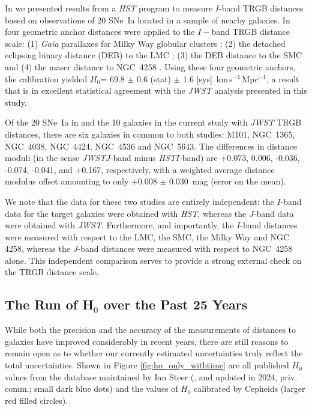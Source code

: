 \documentclass[12pt,modern]{aastex631}
\newcommand{\gaia}{\emph{Gaia}\xspace}
\newcommand{\ho}{$H_{0}$\xspace}
\newcommand{\hounits}{\,km\,s$^{-1}$\,Mpc$^{-1}$\xspace}
\newcommand{\hst}{\emph{HST}\xspace}
\newcommand{\jwst}{\emph{JWST}\xspace}
\newcommand{\sne}{SNe~Ia\xspace}
\newcommand{\ngc}{NGC\,\xspace}
\begin{document}
In \citet{freedman_2019, freedman_2020, freedman_2021} we presented results from a \hst program to measure $I$-band TRGB distances based on observations of 20 \sne located in a sample of nearby galaxies. In \citet{freedman_2021} four geometric anchor distances were applied to the $I-$band TRGB distance scale: (1) \gaia parallaxes for Milky Way globular clusters \citep{cerny_2021a, maiz_apellaniz_2021, vasiliev_baumgardt_2021}; (2) the detached eclipsing binary distance (DEB) to the LMC \citep{hoyt_2023a, pietrzynski_2019}; (3) the DEB distance to the SMC \citep{hoyt_2023a, graczyk_2020} and (4) the maser distance to \ngc 4258 \citep{reid_2019}. Using these four geometric anchors, the calibration yielded \ho = 69.8 $\pm$ 0.6 (stat) $\pm$ 1.6 [sys] \hounits, a result that is in excellent statistical agreement with the \jwst analysis presented in this study.

Of the 20 \sne in \citet{freedman_2021} and the 10 galaxies in the current study with \jwst TRGB distances, there are six galaxies in common to both studies: M101, \ngc 1365, \ngc 4038, \ngc 4424, \ngc 4536 and \ngc 5643.  The differences in distance moduli (in the sense \jwst $J$-band minus \hst $I$-band) are +0.073,  0.006, -0.036, -0.074, -0.041, and  +0.167, respectively, with a weighted average distance modulus offset amounting to only +0.008 $\pm$ 0.030~mag (error on the mean). 

We note that the data for these two studies are entirely independent: the $I$-band data for the target galaxies were obtained with \hst, whereas the $J$-band data were obtained with \jwst. Furthermore, and importantly, the $I$-band distances were measured with respect to the LMC, the SMC, the Milky Way and \ngc 4258, whereas the $J$-band distances were measured with respect to \ngc 4258 alone.  This independent comparison serves to provide a strong external check on the TRGB distance scale. 


\subsection{The Run of H$_0$ over the Past 25 Years}
\label{sec:howithtime}

While both the precision and the accuracy of the measurements of distances to galaxies  have improved considerably in recent years, there are still reasons to remain open as to whether our currently estimated uncertainties truly reflect the total uncertainties.  Shown in  Figure \ref{fig:ho_only_withtime} are all published \ho values from the database maintained by Ian Steer (\citet{steer_2020}, and updated in 2024, priv. comm.; small dark blue dots) and the values of \ho calibrated by Cepheids (larger red filled circles).   
\end{document}
